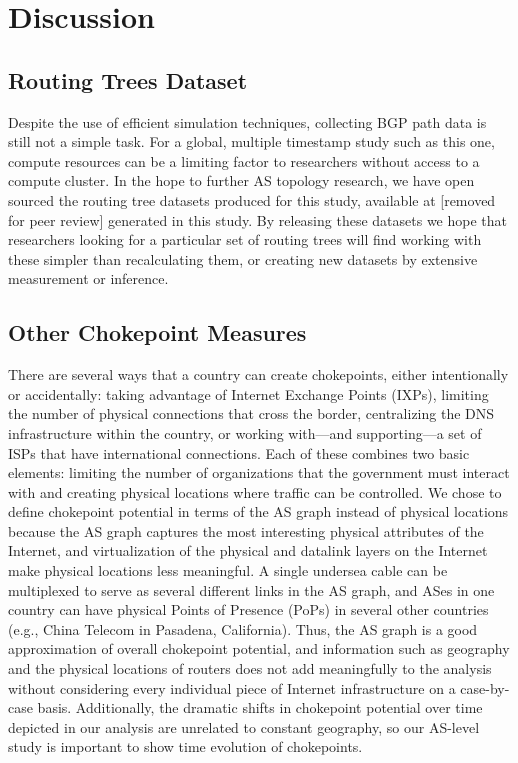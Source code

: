 \section{Discussion}

\subsection{Routing Trees Dataset}
Despite the use of efficient simulation techniques, collecting BGP path data is still not a simple task.
For a global, multiple timestamp study such as this one, compute resources can be a limiting factor to
researchers without access to a compute cluster.
In the hope to further AS topology research, we have open sourced the routing tree datasets produced for
this study, available at [removed for peer review] generated in this study. By releasing these datasets we 
hope that researchers looking for a particular set of routing trees will find working with these simpler 
than recalculating them, or creating new datasets by extensive measurement or
inference.

\subsection{Other Chokepoint Measures}
There are several ways that a country can create chokepoints, either intentionally or accidentally: taking advantage of Internet Exchange Points (IXPs),
limiting the number of physical connections that cross the border, centralizing
the DNS infrastructure within the country, or working
with---and supporting---a set of ISPs that have international connections.
Each of these combines two basic elements: limiting the number of organizations that the government must interact with and creating physical locations where traffic can be controlled.
We chose to define chokepoint potential in terms of the AS graph instead of physical locations because the AS graph captures the most interesting physical attributes of the Internet, and
virtualization of the physical and datalink layers on the Internet make physical locations less meaningful. A single undersea cable can be multiplexed to serve as several different links in
the AS graph, and ASes in one country can have physical Points of Presence (PoPs) in several other countries (e.g., China Telecom in Pasadena, California). Thus, the AS graph is a good approximation
of overall chokepoint potential, and information such as geography and the physical locations of routers does not add meaningfully to the analysis without considering every individual piece of Internet
infrastructure on a case-by-case basis. Additionally, the dramatic shifts in chokepoint potential over time depicted in our analysis are unrelated to constant geography, so our AS-level study is important
to show time evolution of chokepoints.

